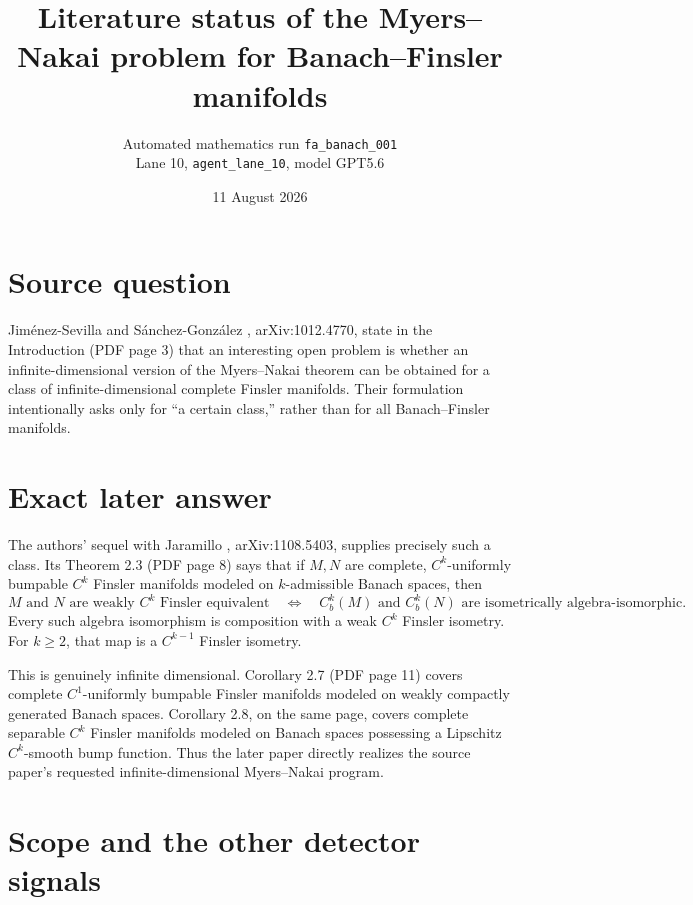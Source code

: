 \documentclass[10pt]{article}
\title{Literature status of the Myers--Nakai problem for Banach--Finsler manifolds}
\author{Automated mathematics run \texttt{fa\_banach\_001}\\
Lane 10, \texttt{agent\_lane\_10}, model GPT5.6}
\date{11 August 2026}
\begin{document}
\maketitle

\begin{center}
\end{center}

\section*{Source question}

Jim\'enez-Sevilla and S\'anchez-Gonz\'alez \cite{JS2011}, arXiv:1012.4770,
state in the Introduction (PDF page 3) that an interesting open problem is
whether an infinite-dimensional version of the Myers--Nakai theorem can be
obtained for a class of infinite-dimensional complete Finsler manifolds.
Their formulation intentionally asks only for ``a certain class,'' rather
than for all Banach--Finsler manifolds.

\section*{Exact later answer}

The authors' sequel with Jaramillo \cite{JJS2011}, arXiv:1108.5403, supplies
precisely such a class. Its Theorem 2.3 (PDF page 8) says that if $M,N$ are
complete, $C^k$-uniformly bumpable $C^k$ Finsler manifolds modeled on
$k$-admissible Banach spaces, then
\[
 M\text{ and }N\text{ are weakly }C^k\text{ Finsler equivalent}
 \quad\Longleftrightarrow\quad
 C_b^k(M)\text{ and }C_b^k(N)\text{ are isometrically algebra-isomorphic}.
\]
Every such algebra isomorphism is composition with a weak $C^k$ Finsler
isometry. For $k\ge2$, that map is a $C^{k-1}$ Finsler isometry.

This is genuinely infinite dimensional. Corollary 2.7 (PDF page 11) covers
complete $C^1$-uniformly bumpable Finsler manifolds modeled on weakly compactly
generated Banach spaces. Corollary 2.8, on the same page, covers complete
separable $C^k$ Finsler manifolds modeled on Banach spaces possessing a
Lipschitz $C^k$-smooth bump function. Thus the later paper directly realizes
the source paper's requested infinite-dimensional Myers--Nakai program.

\section*{Scope and the other detector signals}
\end{document}
